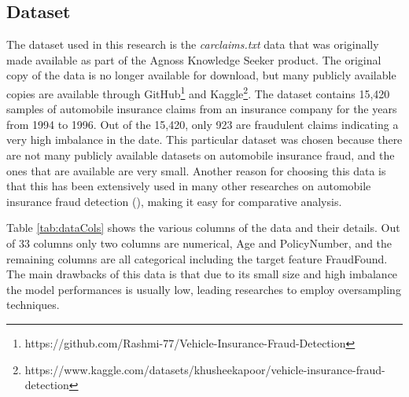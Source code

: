 \documentclass[twoside,11pt]{article}
\begin{document}
\subsection{Dataset}
The dataset used in this research is the \emph{carclaims.txt} data that was originally made available as part of the Agnoss Knowledge Seeker product. The original copy of the data is no longer available for download, but many publicly available copies are available through GitHub\footnote{https://github.com/Rashmi-77/Vehicle-Insurance-Fraud-Detection} and Kaggle\footnote{https://www.kaggle.com/datasets/khusheekapoor/vehicle-insurance-fraud-detection}. The dataset contains 15,420 samples of automobile insurance claims from an insurance company for the years from 1994 to 1996. Out of the 15,420, only 923 are fraudulent claims indicating a very high imbalance in the date. This particular dataset was chosen because there are not many publicly available datasets on automobile insurance fraud, and the ones that are available are very small. Another reason for choosing this data is that this has been extensively used in many other researches on automobile insurance fraud detection (\citealp{GOMEZDENIZ}), making it easy for comparative analysis.

Table \ref{tab:dataCols} shows the various columns of the data and their details. Out of 33 columns only two columns are numerical, Age and PolicyNumber, and the remaining columns are all categorical including the target feature FraudFound. The main drawbacks of this data is that due to its small size and high imbalance the model performances is usually low, leading researches to employ oversampling techniques.
\end{document}
